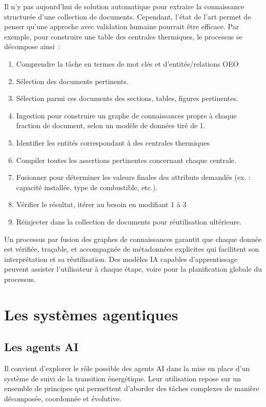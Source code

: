 \documentclass[a4paper,11pt]{report}
\providecommand{\tightlist}{\setlength{\itemsep}{0pt}\setlength{\parskip}{0pt}}
\begin{document}
Il n'y pas aujourd'hui de solution automatique pour extraire la connaissance structurée d'une collection de documents. Cependant, l'état de l'art permet de penser qu'une approche avec validation humaine pourrait être efficace. Par exemple, pour construire une table des centrales thermiques, le processus se décompose ainsi~:

\begin{enumerate}
\def\labelenumi{\arabic{enumi}.}
\tightlist
\item
  Comprendre la tâche en termes de mot clés et d'entités/relations OEO
\item
  Sélection des documents pertinents.
\item
  Sélection parmi ces documents des sections, tables, figures pertinentes.
\item
  Ingestion pour construire un graphe de connaissances propre à chaque fraction de document, selon un modèle de données tiré de 1.
\item
  Identifier les entités correspondant à des centrales thermiques
\item
  Compiler toutes les assertions pertinentes concernant chaque centrale.
\item
  Fusionner pour déterminer les valeurs finales des attributs demandés (ex. : capacité installée, type de combustible, etc.).
\item
  Vérifier le résultat, itérer au besoin en modifiant 1 à 3
\item
  Réinjecter dans la collection de documents pour réutilisation ultérieure.
\end{enumerate}

Un processus par fusion des graphes de connaissances garantit que chaque donnée est vérifiée, traçable, et accompagnée de métadonnées explicites qui facilitent son interprétation et sa réutilisation. Des modèles IA capables d'apprentissage peuvent assister l'utilisateur à chaque étape, voire pour la planification globale du processus.

\chapter{Les systèmes agentiques}\label{les-systuxe8mes-agentiques}

\section{Les agents AI}\label{les-agents-ai}

Il convient d'explorer le rôle possible des agents AI dans la mise en place d'un système de suivi de la transition énergétique. Leur utilisation repose sur un ensemble de principes qui permettent d'aborder des tâches complexes de manière décomposée, coordonnée et évolutive.
\end{document}
